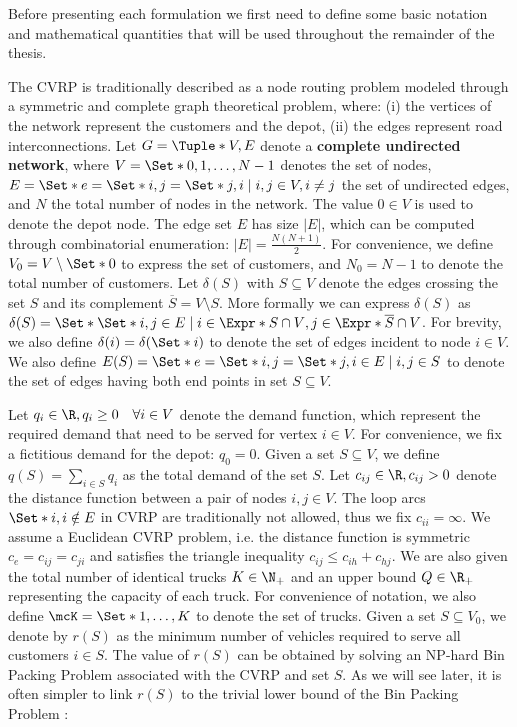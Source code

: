 Before presenting each formulation we first need to define some basic notation
and mathematical quantities that will be used throughout the remainder of the thesis.

\medskip

The CVRP is traditionally described as a node routing problem modeled through a symmetric and complete graph theoretical problem,
where: (i) the vertices of the network represent the customers and the depot,
(ii) the edges represent road interconnections.
Let $G = \Tuple*{V, E}$ denote a \textbf{complete undirected network}, where $V = \Set*{0, 1, \dots, N - 1}$ denotes the set of nodes,
$E = \Set*{e = \Set*{i, j} = \Set*{j, i} \mid \allowbreak i,j \in V, \allowbreak i \ne j}$ the set of undirected edges,
and $N$ the total number of nodes in the network.
The value $0 \in V$ is used to denote the depot node.
The edge set $E$ has size $|E|$, which can be computed through combinatorial enumeration: $|E| = \frac{N (N+1)}{2}$.
For convenience, we define $V_0 = V \setminus \Set*{0}$ to express the set of customers,
and $N_0 = N - 1$ to denote the total number of customers.
Let $\delta(S)$ with $S \subseteq V$ denote the edges crossing the set $S$ and its complement $\overline{S} = V \setminus S$.
More formally we can express $\delta(S)$ as $\delta(S) = \Set*{ \Set*{i, j} \in E \mid i \in \Expr*{S \cap V}, j \in \Expr*{ \overline{S} \cap V } }$.
For brevity, we also define $\delta(i) = \delta(\Set*{i})$ to denote the set of edges incident to node $i \in V$.
We also define $E(S) = \Set*{e = \Set*{i, j} = \Set*{j, i}\in E \mid i, j \in S}$ to denote the set of edges having both end points in set $S \subseteq V$.

Let $q_{i} \in \R, q_{i} \ge 0 \quad \forall i \in V$ denote the demand function, which represent the required demand that need to be served for vertex $i \in V$.
For convenience, we fix a fictitious demand for the depot: $q_0 = 0$.
Given a set $S \subseteq V$, we define $q(S) = \sum_{i \in S} q_i$ as the total demand of the set $S$.
Let $c_{ij} \in \R, c_{ij} > 0$ denote the distance function between a pair of nodes  $i, j \in V$.
The loop arcs $\Set*{i, i} \notin E$ in CVRP are traditionally not allowed, thus we fix $c_{ii} = \infty$.
We assume a Euclidean CVRP problem, i.e. the distance function is symmetric $c_e = c_{ij} = c_{ji}$ and satisfies the triangle inequality $c_{ij} \le c_{ih} + c_{hj}$.
We are also given the total number of identical trucks $K \in \N_+$ and an upper bound $Q \in \R_+$ representing the capacity of each truck.
For convenience of notation, we also define $\mcK = \Set*{1, \dots, K}$ to denote the set of trucks.
Given a set $S \subseteq V_0$, we denote by $r(S)$ as the minimum number of vehicles required to serve all customers $i \in S$.
The value of $r(S)$ can be obtained by solving an NP-hard Bin Packing Problem associated with the CVRP and set $S$.
As we will see later, it is often simpler to link $r(S)$ to the trivial lower bound of the Bin Packing Problem \parencite{martello1990}:

